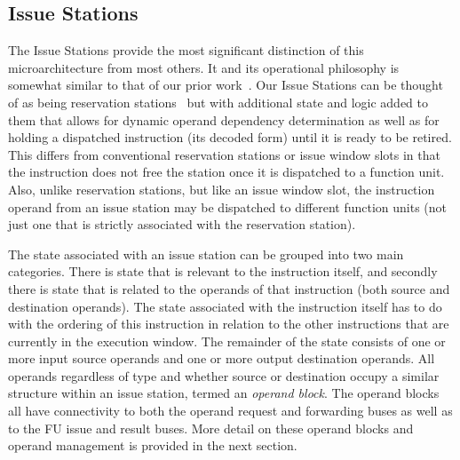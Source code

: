 \documentclass[10pt,dvips]{article}
\begin{document}
\subsection{Issue Stations}
%
The Issue Stations provide the most significant distinction of this
microarchitecture from most others.  It and its operational philosophy
is somewhat similar to that of our prior work~\cite{undisclosed1}.
Our Issue Stations can be thought of as being 
reservation stations~\cite{Anderson67,Tom67}
but with additional state and logic added to them that allows
for dynamic operand dependency determination as well as
for holding a dispatched instruction (its decoded form) 
until it is ready to be
retired.  This differs from conventional reservation stations
or issue window slots in that the instruction does not free
the station once it is dispatched to a function unit.
Also, unlike reservation stations, but like an issue window slot,
the instruction operand from an issue station may be dispatched
to different function units (not just one that is strictly
associated with the reservation station).

The state associated with an issue station can be grouped into
two main categories.  There is state that is relevant to
the instruction itself, and secondly there is state that is
related to the operands of that instruction (both source and
destination operands).
The state associated with the instruction itself has to do
with the ordering of this instruction in relation to the other
instructions that are currently in the execution window.
The remainder of the state consists of one or more input
source operands and one or more output destination operands.
All operands regardless of type and whether source or destination
occupy a similar structure within an issue station, termed an
\textit{operand block}.
The operand blocks all have connectivity to both the
operand request and forwarding buses as well as to the FU
issue and result buses.
More detail on these operand blocks and operand management
is provided in the next section.
\end{document}
